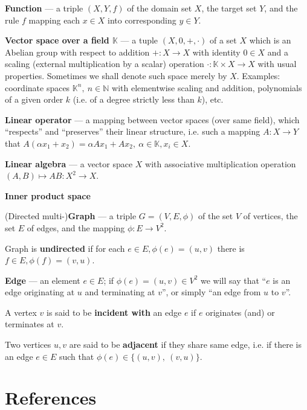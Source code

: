 \documentclass[14pt,a4paper]{extarticle}
\theoremstyle{definition}
\begin{document}
\textbf{Function} --- a triple \( (X, Y, f) \) of the domain set \( X \),
the target set \( Y \), and the rule \( f \) mapping each \( x\in X\)
into corresponding \( y\in Y \).

\textbf{Vector space over a field \(\mathbb{K}\) } --- a tuple \( (X, 0, +, \cdot) \)
of a set \( X \) which is an Abelian group with respect to addition \( +:X\to X\)
with identity \( 0\in X \) and a scaling (external multiplication by a scalar)
operation \(\cdot: \mathbb{K}\times X \to X \) with usual properties.
Sometimes we shall denote such space merely by \( X \).
Examples: coordinate spaces \( \mathbb{K}^n,\ n\in\mathbb{N} \) with elementwise
scaling and addition, polynomials of a given order \( k \) (i.e. of a degree
strictly less than \( k \)), etc.

\textbf{Linear operator} --- a mapping between vector spaces (over same field),
which ``respects'' and ``preserves'' their linear structure, i.e. such a mapping
\( A:X\to Y \) that \( A(\alpha x_1 + x_2) = \alpha Ax_1 + Ax_2,\
\alpha\in\mathbb{K}, x_i\in X \).

\textbf{Linear algebra} --- a vector space \( X \) with associative
multiplication operation \( (A, B)\mapsto AB: X^2\to X \).

\textbf{Inner product space}

(Directed multi-)\textbf{Graph} --- a triple \(G = (V, E, \phi)\)
of the set \( V \) of vertices, the set \( E \) of edges,
and the mapping \( \phi: E\to V^2\).

Graph is \textbf{undirected} if for each \( e\in E, \phi(e)=(u, v)\)
there is \( f\in E, \phi(f)=(v, u) \).

\textbf{Edge} --- an element \( e\in E \); if \( \phi(e) = (u, v)\in V^2 \)
we will say that ``\( e \) is an edge originating at \( u \) and terminating at \(
v \)'', or simply ``an edge from \( u \) to \( v \)''.

A vertex \( v \) is said to be \textbf{incident with} an edge \( e \)
if \( e \) originates (and) or terminates at \( v \).

Two vertices \( u, v\) are said to be \textbf{adjacent}
if they share same edge, i.e. if there is an edge \( e\in E \)
such that \( \phi(e)\in\{(u, v),\ (v, u) \}\).
\newpage
\section{References}
\nocite{*}
\printbibliography[heading=none]
\end{document}
